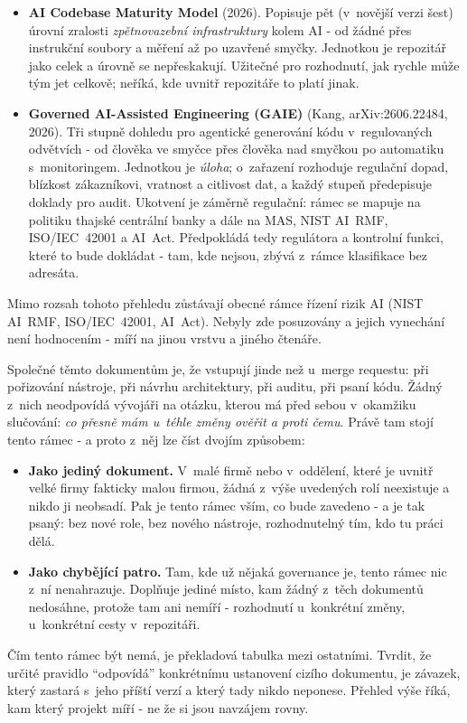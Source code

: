 \begin{itemize}
\item \textbf{AI Codebase Maturity Model} (2026).
Popisuje pět (v~novější verzi šest) úrovní zralosti \emph{zpětnovazební infrastruktury} kolem AI - od žádné přes instrukční soubory a měření až po uzavřené smyčky.
Jednotkou je repozitář jako celek a úrovně se nepřeskakují.
Užitečné pro rozhodnutí, jak rychle může tým jet celkově; neříká, kde uvnitř repozitáře to platí jinak.

\item \textbf{Governed AI-Assisted Engineering (GAIE)} (Kang, arXiv:2606.22484, 2026).
Tři stupně dohledu pro agentické generování kódu v~regulovaných odvětvích - od člověka ve smyčce přes člověka nad smyčkou po automatiku s~monitoringem.
Jednotkou je \emph{úloha}; o~zařazení rozhoduje regulační dopad, blízkost zákazníkovi, vratnost a citlivost dat, a každý stupeň předepisuje doklady pro audit.
Ukotvení je záměrně regulační: rámec se mapuje na politiku thajské centrální banky a dále na MAS, NIST AI~RMF, ISO/IEC~42001 a AI~Act.
Předpokládá tedy regulátora a kontrolní funkci, které to bude dokládat - tam, kde nejsou, zbývá z~rámce klasifikace bez adresáta.
\end{itemize}

Mimo rozsah tohoto přehledu zůstávají obecné rámce řízení rizik AI (NIST AI~RMF, ISO/IEC~42001, AI~Act).
Nebyly zde posuzovány a jejich vynechání není hodnocením - míří na jinou vrstvu a jiného čtenáře.

\medskip
\noindent
Společné těmto dokumentům je, že vstupují jinde než u~merge requestu: při pořizování nástroje, při návrhu architektury, při auditu, při psaní kódu.
Žádný z~nich neodpovídá vývojáři na otázku, kterou má před sebou v~okamžiku slučování: \emph{co přesně mám u~téhle změny ověřit a proti čemu}.
Právě tam stojí tento rámec - a proto z~něj lze číst dvojím způsobem:

\begin{itemize}
\item \textbf{Jako jediný dokument.}
V~malé firmě nebo v~oddělení, které je uvnitř velké firmy fakticky malou firmou, žádná z~výše uvedených rolí neexistuje a nikdo ji neobsadí.
Pak je tento rámec vším, co bude zavedeno - a je tak psaný: bez nové role, bez nového nástroje, rozhodnutelný tím, kdo tu práci dělá.
\item \textbf{Jako chybějící patro.}
Tam, kde už nějaká governance je, tento rámec nic z~ní nenahrazuje.
Doplňuje jediné místo, kam žádný z~těch dokumentů nedosáhne, protože tam ani nemíří - rozhodnutí u~konkrétní změny, u~konkrétní cesty v~repozitáři.
\end{itemize}

Čím tento rámec být nemá, je překladová tabulka mezi ostatními.
Tvrdit, že určité pravidlo \enquote{odpovídá} konkrétnímu ustanovení cizího dokumentu, je závazek, který zastará s~jeho příští verzí a který tady nikdo neponese.
Přehled výše říká, kam který projekt míří - ne že si jsou navzájem rovny.


